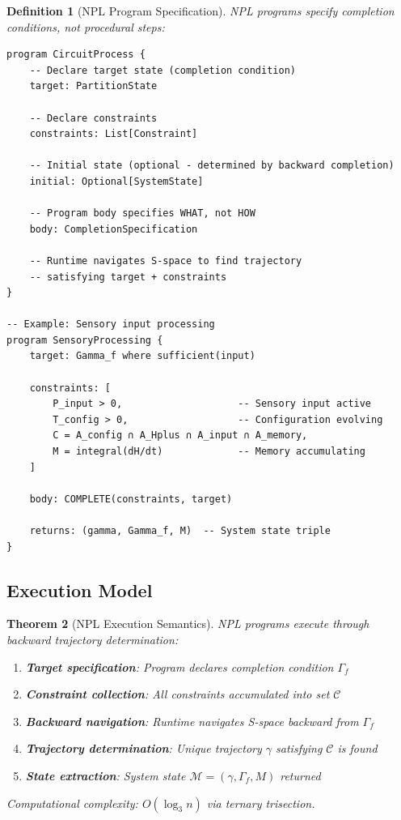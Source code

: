 \documentclass[aps,prd,twocolumn,superscriptaddress,floatfix,nofootinbib]{revtex4-2}
\newtheorem{theorem}{Theorem}[section]
\newtheorem{definition}[theorem]{Definition}
\theoremstyle{remark}
\begin{document}
\begin{definition}[NPL Program Specification]
\label{def:npl_program}
NPL programs specify completion conditions, not procedural steps:
\begin{verbatim}
program CircuitProcess {
    -- Declare target state (completion condition)
    target: PartitionState

    -- Declare constraints
    constraints: List[Constraint]

    -- Initial state (optional - determined by backward completion)
    initial: Optional[SystemState]

    -- Program body specifies WHAT, not HOW
    body: CompletionSpecification

    -- Runtime navigates S-space to find trajectory
    -- satisfying target + constraints
}

-- Example: Sensory input processing
program SensoryProcessing {
    target: Gamma_f where sufficient(input)

    constraints: [
        P_input > 0,                    -- Sensory input active
        T_config > 0,                   -- Configuration evolving
        C = A_config ∩ A_Hplus ∩ A_input ∩ A_memory,
        M = integral(dH/dt)             -- Memory accumulating
    ]

    body: COMPLETE(constraints, target)

    returns: (gamma, Gamma_f, M)  -- System state triple
}
\end{verbatim}
\end{definition}

\subsection{Execution Model}

\begin{theorem}[NPL Execution Semantics]
\label{thm:npl_execution}
NPL programs execute through backward trajectory determination:
\begin{enumerate}
\item \textbf{Target specification}: Program declares completion condition $\Gamma_f$
\item \textbf{Constraint collection}: All constraints accumulated into set $\mathcal{C}$
\item \textbf{Backward navigation}: Runtime navigates S-space backward from $\Gamma_f$
\item \textbf{Trajectory determination}: Unique trajectory $\gamma$ satisfying $\mathcal{C}$ is found
\item \textbf{State extraction}: System state $\mathcal{M} = (\gamma, \Gamma_f, M)$ returned
\end{enumerate}
Computational complexity: $O(\log_3 n)$ via ternary trisection.
\end{theorem}
\end{document}
